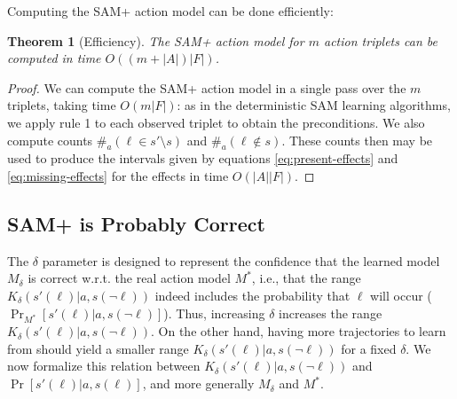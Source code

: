 \documentclass[letterpaper]{article} %
\newtheorem{theorem}{Theorem}
\newcommand{\tuple}[1]{\ensuremath{\left \langle #1 \right \rangle }}
\begin{document}


\noindent Computing the SAM+ action model can be done efficiently:
\begin{theorem}[Efficiency]
The SAM+ action model for $m$ action triplets can be computed in time $O((m+|A|)|F|)$.
\end{theorem}
\begin{proof}
We can compute the SAM+ action model in a single pass over the $m$ triplets, taking time $O(m|F|)$: as in the deterministic SAM learning algorithms, we apply rule 1 to each observed triplet to obtain the preconditions. We also compute counts $\#_a(\ell\in s'\setminus s)$ and $\#_a(\ell\notin s)$. These counts then may be used to produce the intervals given by equations \ref{eq:present-effects} and \ref{eq:missing-effects} for the effects in time $O(|A||F|)$.
\end{proof}


\subsection{SAM+ is Probably Correct}

The $\delta$ parameter is designed to represent the confidence that the learned model $M_\delta$ is correct w.r.t. the real action model $M^*$, i.e., that the range $K_\delta(s'(\ell)|a,s(\neg\ell))$ indeed includes the probability that $\ell$ will occur ($\Pr_{M^*}[s'(\ell)|a,s(\neg\ell)]$). 
Thus, increasing $\delta$ increases the range $K_\delta(s'(\ell)|a,s(\neg\ell))$. 
On the other hand, having more trajectories to learn from should yield a smaller range $K_\delta(s'(\ell)|a,s(\neg\ell))$ for a fixed $\delta$. %
We now formalize this relation between $K_\delta(s'(\ell)|a,s(\neg\ell))$ and $\Pr[s'(\ell)|a,s(\ell)]$, and more generally $M_\delta$ and $M^*$. 
\end{document}
